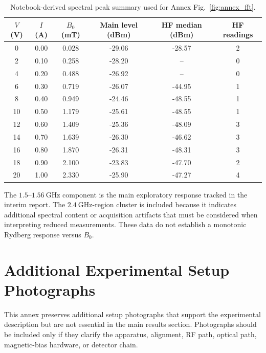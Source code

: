 \documentclass{ieeeaccess}
\begin{document}
\begin{table}[!t]
\caption{Notebook-derived spectral peak summary used for Annex Fig.~\ref{fig:annex_fft}.}
\label{tab:annex_notebook_spectral_data}
\centering
\renewcommand{\arraystretch}{1.10}
\scriptsize
\begin{tabular}{c c c c c c}
\hline
\textbf{\(V\) (V)} & \textbf{\(I\) (A)} & \textbf{\(B_0\) (mT)} & \textbf{Main level (dBm)} & \textbf{HF median (dBm)} & \textbf{HF readings} \\
\hline
0  & 0.00 & 0.028 & -29.06 & -28.57 & 2 \\
2  & 0.10 & 0.258 & -28.20 & --     & 0 \\
4  & 0.20 & 0.488 & -26.92 & --     & 0 \\
6  & 0.30 & 0.719 & -26.07 & -44.95 & 1 \\
8  & 0.40 & 0.949 & -24.46 & -48.55 & 1 \\
10 & 0.50 & 1.179 & -25.61 & -48.55 & 1 \\
12 & 0.60 & 1.409 & -25.36 & -48.09 & 3 \\
14 & 0.70 & 1.639 & -26.30 & -46.62 & 3 \\
16 & 0.80 & 1.870 & -26.31 & -48.31 & 3 \\
18 & 0.90 & 2.100 & -23.83 & -47.70 & 2 \\
20 & 1.00 & 2.330 & -25.90 & -47.27 & 4 \\
\hline
\end{tabular}
\end{table}

The \(1.5\text{--}1.56~\mathrm{GHz}\) component is the main exploratory response tracked in the interim report. The \(2.4~\mathrm{GHz}\)-region cluster is included because it indicates additional spectral content or acquisition artifacts that must be considered when interpreting reduced measurements. These data do not establish a monotonic Rydberg response versus \(B_0\).

\section{Additional Experimental Setup Photographs}
\label{annex:setup_photos}

This annex preserves additional setup photographs that support the experimental description but are not essential in the main results section. Photographs should be included only if they clarify the apparatus, alignment, RF path, optical path, magnetic-bias hardware, or detector chain.
\end{document}
